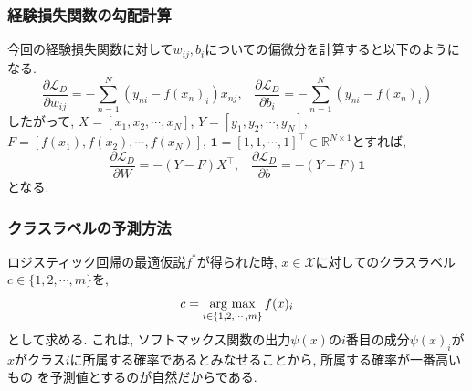 \documentclass[dvipdfmx,11pt]{beamer}		%
\newcommand{\R}{\mathbb{R}}
\newcommand{\X}{\mathcal{X}}
\newcommand{\Loss}{\mathcal{L}_{D}}
\newcommand{\argmax}{\mathop{\rm arg~max}\limits}
\begin{document}
    \begin{frame}
        \frametitle{経験損失関数の勾配計算}
        今回の経験損失関数に対して$w_{ij}, b_{i}$についての偏微分を計算すると以下のようになる. 
        \begin{equation*}
            \frac{\partial\Loss}{\partial w_{ij}} = -\sum_{n = 1}^{N}\left(y_{ni} - f(x_{n})_{i}\right)x_{nj}, \hspace{10pt}\frac{\partial\Loss}{\partial b_{i}} = -\sum_{n = 1}^{N}(y_{ni} - f(x_{n})_{i})
        \end{equation*}
        したがって, $X = [x_{1}, x_{2}, \cdots, x_{N}]$, $Y = [y_1, y_2, \cdots, y_N]$, $F = [f(x_1), f(x_2), \cdots, f(x_N)]$, 
        $\mathbf{1} = [1, 1, \cdots, 1]^{\top}\in\R^{N\times 1}$とすれば,
        \begin{equation*}
            \frac{\partial\Loss}{\partial W} = -(Y - F)X^{\top}, \hspace{10pt}  \frac{\partial\Loss}{\partial b} = -(Y - F)\mathbf{1}
        \end{equation*}
        となる. 
    \end{frame}
    \begin{frame}
        \frametitle{クラスラベルの予測方法}
        ロジスティック回帰の最適仮説$f^{*}$が得られた時, $x\in\X$に対してのクラスラベル
        $c\in\{1, 2, \cdots, m\}$を,
        \begin{equation*}
            c = \argmax_{i\in\{1, 2, \cdots, m\}}f(x)_{i}
        \end{equation*}
        として求める. これは, ソフトマックス関数の出力$\psi(x)$の$i$番目の成分$\psi(x)_i$が
        $x$がクラス$i$に所属する確率であるとみなせることから, 所属する確率が一番高いもの
        を予測値とするのが自然だからである. 
    \end{frame}
\end{document}
